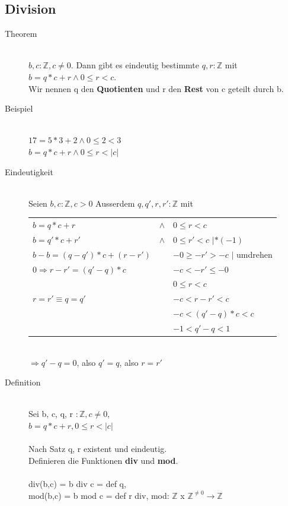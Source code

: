 \documentclass[a4paper,10pt]{article}
\newcommand{\ZN}{\mathbb{Z}} %
\newcommand{\Bold}[1]{\textbf{#1}} %
\newcommand{\ra}{\rightarrow}
\newcommand{\Ra}{\Rightarrow}
\begin{document}
\subsection{Division}
\begin{description}
	\item[Theorem] \hfill \\
		$b, c:\ZN, c \neq 0$. Dann gibt es eindeutig bestimmte $q,r : \ZN$ mit $b=q*c+r \wedge 0 \leq r < c$. \\
		Wir nennen q den \Bold {Quotienten} und r den \Bold {Rest} von c geteilt durch b.
	\item[Beispiel] \hfill \\
		$17=5*3+2 \wedge 0 \leq 2 < 3$ \\
		$b=q*c+r \wedge 0 \leq r < |c|$
	\item[Eindeutigkeit] \hfill \\
		Seien $b,c : \ZN, c > 0$ Ausserdem $q,q',r,r':\ZN$ mit \\
		\begin{tabular}{l c l}
			$b=q*c + r$ & $\wedge$ & $0 \leq r < c$ \\
			$b=q'*c+r'$ & $\wedge$ & $0 \leq r' < c$ $| *(-1)$ \\
			\hline
			$b-b = (q-q') * c + (r-r')$ & & $-0 \geq -r' > -c$ $|$ umdrehen \\
			$0 \Ra r-r'=(q'-q) *c$ && $-c < -r' \leq -0$\\
			&& $0 \leq r < c$ \\
			\hline
			$r=r' \equiv q = q'$ && $-c < r-r' < c$ \\
			&& $-c < (q'-q)*c<c$ \\
			&& $-1 < q' - q < 1$ \\
		\end{tabular} \\
	$\Ra q'-q =0$, also $q'=q$, also $r=r'$ \\
	\item[Definition] \hfill \\
		Sei b, c, q, r $:\ZN, c \neq 0$, \\
		$b=q*c+r, 0 \leq r < |c|$ \\ \\
		Nach Satz q, r existent und eindeutig. \\
		Definieren die Funktionen \Bold {div} und \Bold {mod}. \\
		\\
		div(b,c) = b div c = def q, \\
		mod(b,c) = b mod c = def r
		div, mod: $\ZN$ x ${\ZN}^{\neq 0} \ra \ZN$
\end{description}
\end{document}
